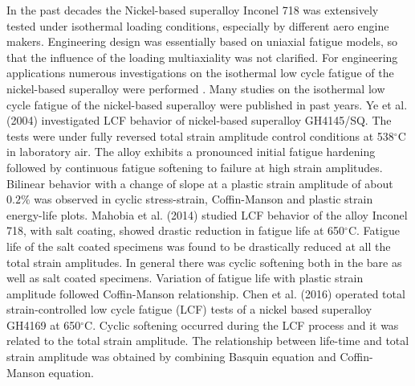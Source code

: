 In the past decades the Nickel-based superalloy Inconel 718 was extensively tested under isothermal loading conditions, especially by different aero engine makers. Engineering design was essentially based on uniaxial fatigue models, so that the influence of the loading multiaxiality was not clarified.
For engineering applications numerous investigations on the isothermal low cycle fatigue of the nickel-based superalloy were performed \cite{Koch85, Morrow88, Mahobia2014, Chen2016175, William1995, kim1988elevated, nelson1992creep}.
Many studies on the isothermal low cycle fatigue of the nickel-based superalloy were published in past years.
Ye et al. (2004) \cite{ye2004low} investigated LCF behavior of nickel-based superalloy GH4145/SQ. The tests were under fully reversed total strain amplitude control conditions at 538$^{\circ}$C in laboratory air. The alloy exhibits a pronounced initial fatigue hardening followed by continuous fatigue softening to failure at high strain amplitudes. Bilinear behavior with a change of slope at a plastic strain amplitude of about $0.2\%$ was observed in cyclic stress-strain, Coffin-Manson and plastic strain energy-life plots.
Mahobia et al. (2014) \cite{mahobia2014effect} studied LCF behavior of the alloy Inconel 718, with salt coating, showed drastic reduction in fatigue life at 650$^{\circ}$C. Fatigue life of the salt coated specimens was found to be drastically reduced at all the total strain amplitudes. In general there was cyclic softening both in the bare as well as salt coated specimens. Variation of fatigue life with plastic strain amplitude followed Coffin-Manson relationship.
Chen et al. (2016) \cite{Chen2016175} operated total strain-controlled low cycle fatigue (LCF) tests of a nickel based superalloy GH4169 at 650$^{\circ}$C. Cyclic softening occurred during the LCF process and it was related to the total strain amplitude. The relationship between life-time and total strain amplitude was obtained by combining Basquin equation and Coffin-Manson equation.

